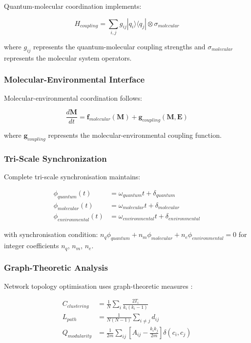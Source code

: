 \documentclass[12pt,a4paper]{article}
\begin{document}
Quantum-molecular coordination implements:

\begin{equation}
H_{coupling} = \sum_{i,j} g_{ij} |q_i\rangle\langle q_j| \otimes \sigma_{molecular}
\end{equation}

where $g_{ij}$ represents the quantum-molecular coupling strengths and $\sigma_{molecular}$ represents the molecular system operators.

\subsubsection{Molecular-Environmental Interface}

Molecular-environmental coordination follows:

\begin{equation}
\frac{d\mathbf{M}}{dt} = \mathbf{f}_{molecular}(\mathbf{M}) + \mathbf{g}_{coupling}(\mathbf{M}, \mathbf{E})
\end{equation}

where $\mathbf{g}_{coupling}$ represents the molecular-environmental coupling function.

\subsubsection{Tri-Scale Synchronization}

Complete tri-scale synchronisation maintains:

\begin{align}
\phi_{quantum}(t) &= \omega_{quantum} t + \delta_{quantum} \\
\phi_{molecular}(t) &= \omega_{molecular} t + \delta_{molecular} \\
\phi_{environmental}(t) &= \omega_{environmental} t + \delta_{environmental}
\end{align}

with synchronisation condition: $n_q \phi_{quantum} + n_m \phi_{molecular} + n_e \phi_{environmental} = 0$ for integer coefficients $n_q$, $n_m$, $n_e$.


\subsubsection{Graph-Theoretic Analysis}

Network topology optimisation uses graph-theoretic measures \cite{newman2010networks,barabasi2016network}:

\begin{align}
C_{clustering} &= \frac{1}{N} \sum_i \frac{2T_i}{k_i(k_i-1)} \\
L_{path} &= \frac{1}{N(N-1)} \sum_{i \neq j} d_{ij} \\
Q_{modularity} &= \frac{1}{2m} \sum_{ij} \left[ A_{ij} - \frac{k_i k_j}{2m} \right] \delta(c_i, c_j)
\end{align}
\end{document}
